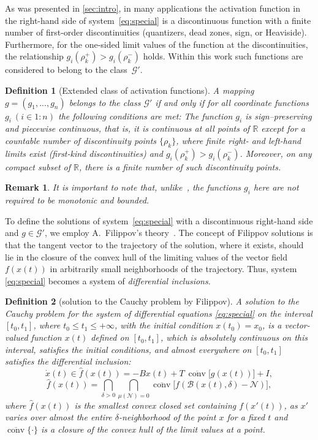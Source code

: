 \documentclass[journal]{IEEEtran}
\theoremstyle{myplain}
\newtheorem{definition}{Definition}
\newtheorem{remark}{Remark}
\begin{document}
As was presented in \ref{sec:intro}, in many applications the activation function in the right-hand side of system~\eqref{eq:special}
is a discontinuous function with a finite number of first-order discontinuities (quantizers, dead zones, sign, or Heaviside).
Furthermore, for the one-sided limit values of the function at the discontinuities,
the relationship $g_i(\rho^+_k)>g_i(\rho^-_k)$ holds.
Within this work such functions are considered to belong to the class~$\mathcal{G'}$.

\smallskip
\begin{definition}[Extended class of activation functions]\label{G_n}
A mapping $g = (g_1,...,g_n)$ belongs to the class $\mathcal{G'}$ if and only if for all coordinate functions $g_i ~ (i \in 1:n)$ the following conditions are met:
The function $g_i$ is sign–preserving and piecewise continuous, that is, it is continuous at all points of $\mathbb{R}$ except for a countable number of discontinuity points $\{\rho_k\}$, where finite right- and left-hand limits exist (first-kind discontinuities) and $g_i(\rho^+_k)>g_i(\rho^-_k)$. Moreover, on any compact subset of $\mathbb{R}$, there is a finite number of such discontinuity points.
\end{definition}
\begin{remark}
    It is important to note that, 
    unlike~\cite{p1}, the functions $g_i$ here are not required to be monotonic and bounded.
\end{remark}

To define the solutions of system~\eqref{eq:special} with 
a discontinuous right-hand side and $g\in\mathcal{G'}$,
we employ A.~Filippov's theory~\cite{Filippov1988}.
The concept of Filippov solutions is that the tangent vector
to the trajectory of the solution, where it exists, should lie
in the closure of the convex hull of the limiting values
of the vector field $f(x(t))$ in arbitrarily small neighborhoods of the trajectory. 
Thus, system \eqref{eq:special} becomes a system of \emph{differential inclusions}.

\smallskip 
\begin{definition}[solution to the Cauchy problem by Filippov]\label{fillipovsol}
\textit{A solution to the Cauchy problem} for the system of differential equations \eqref{eq:special} on the interval $[t_0,t_1]$, where $t_0\leqslant t_1 \leqslant +\infty$, with the initial condition $x(t_0) = x_0$, is a vector-valued function $x(t)$ defined on $[t_0,t_1]$, which is absolutely continuous on this interval, satisfies the initial conditions, and almost everywhere on $[t_0,t_1]$ satisfies the differential inclusion:
\[  
    \dot x (t) \in \hat f(x(t)) = -Bx(t)+T~\overline{\operatorname{conv}}\big[g(x(t))\big]+I,
    \label{1.2}
\]
\[  
    \hat f(x(t)) = \bigcap\limits_{\delta>0}\bigcap\limits_{\mu(\mathcal{N})=0}\overline{\operatorname{conv}}\big[f(\mathcal{B}(x(t),\delta) - \mathcal{N})\big], 
\]
where $\hat f(x(t))$ is the smallest convex 
closed set containing $f(x'(t))$, as $x'$ 
varies over almost the entire $\delta$-neighborhood 
of the point $x$ for a fixed $t$ and 
$\overline{\operatorname{conv}}\{\cdot\}$ is a closure of the convex hull of the limit values at a point. 
\end{definition}
\end{document}
